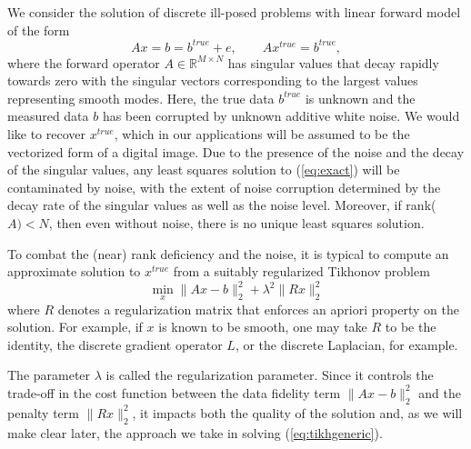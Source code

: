 We consider the solution of discrete ill-posed problems with linear forward model of the form~\cite{Hansenbk}
\begin{equation} \label{eq:exact} A x = b = b^{true} + e,  \qquad Ax^{true} = b^{true},\end{equation} 
where the forward operator $A \in \mathbb{R}^{M \times N}$ has singular values that decay 
rapidly towards zero with the singular vectors corresponding to the largest values representing smooth modes.  Here, the true data $b^{true}$ is unknown and the measured data $b$ has been corrupted by
unknown additive white noise.   We would like to recover $x^{true}$, which in our applications 
will be assumed to be the vectorized form of a digital image.   Due to the presence of the noise and the 
decay of the singular values, any least squares solution to (\ref{eq:exact}) will be contaminated by
noise, with the extent of noise corruption determined by the decay rate of the singular values as well as the noise level.  Moreover, if rank($A)< N$, then even without noise, there is no unique least squares solution.  

To combat the (near) rank deficiency and the noise, it is typical to compute an approximate solution to $x^{true}$ from a suitably regularized Tikhonov \cite{Tikhonov} problem
\begin{equation}   \label{eq:tikhgeneric} \min_{x} \| A x - b \|_2^2 + \lambda^2 \| R x \|_2^2  \end{equation}
where $R$ denotes a regularization matrix that enforces an apriori property on the solution.   For example, if 
$x$ is known to be smooth, one may take $R$ to be the identity, the discrete gradient operator $L$, or the discrete Laplacian, for example.  

The parameter $\lambda$ is called the regularization parameter.  Since it controls the trade-off in the cost function between the data fidelity term $\| A x - b \|_2^2$ and the penalty term $\| R x \|_2^2$, it impacts  
both the quality of the solution and, as we will make clear later, the approach we take in solving (\ref{eq:tikhgeneric}).

